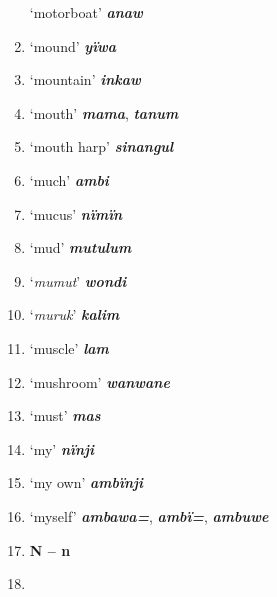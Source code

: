 \begin{enumerate}[noitemsep, label={}, align=left, widest=190, labelsep=1ex,leftmargin=*,itemindent=-10pt]
‘motorboat’ \textbf{\textit{anaw}} \item
‘mound’ \textbf{\textit{yïwa}} \item
‘mountain’ \textbf{\textit{inkaw}} \item
‘mouth’ \textbf{\textit{mama}}, \textbf{\textit{tanum}} \item
‘mouth harp’ \textbf{\textit{sinangul}} \item
‘much’ \textbf{\textit{ambi}} \item
‘mucus’ \textbf{\textit{nïmïn}} \item
‘mud’ \textbf{\textit{mutulum}} \item
‘\textit{mumut}’ \textbf{\textit{wondi}} \item
‘\textit{muruk}’ \textbf{\textit{kalim}} \item
‘muscle’ \textbf{\textit{lam}} \item
‘mushroom’ \textbf{\textit{wanwane}} \item
‘must’ \textbf{\textit{mas}} \item
‘my’ \textbf{\textit{nïnji}} \item
‘my own’ \textbf{\textit{ambïnji}} \item
‘myself’ \textbf{\textit{ambawa=}}, \textbf{\textit{ambï=}}, \textbf{\textit{ambuwe}}\\ \item

\noindent \textbf{N – n}\\ \item


\end{enumerate}

